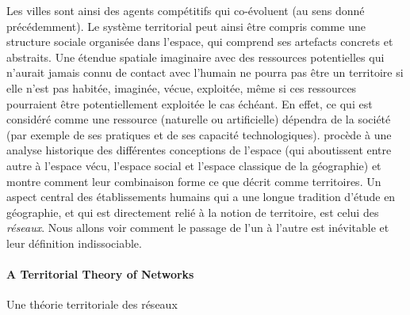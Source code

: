 {      Les villes sont ainsi des agents  compétitifs qui co-évoluent (au sens donné précédemment). Le système territorial peut ainsi être compris comme une structure sociale organisée dans l'espace, qui comprend ses artefacts concrets et abstraits. Une étendue spatiale imaginaire avec des ressources potentielles qui n'aurait jamais connu de contact avec l'humain ne pourra pas être un territoire si elle n'est pas habitée, imaginée, vécue, exploitée, même si ces ressources pourraient être potentiellement exploitée le cas échéant. En effet, ce qui est considéré comme une ressource (naturelle ou artificielle) dépendra de la société (par exemple de ses pratiques et de ses capacité technologiques). \cite{di1998espace} procède à une analyse historique des différentes conceptions de l'espace (qui aboutissent entre autre à l'espace vécu, l'espace social et l'espace classique de la géographie) et montre comment leur combinaison forme ce que  décrit comme territoires.
       Un aspect central des établissements humains qui a une longue tradition d'étude en géographie, et qui est directement relié à la notion de territoire, est celui des \emph{réseaux}. Nous allons voir comment le passage de l'un à l'autre est inévitable et leur définition indissociable.
}


\paragraph{A Territorial Theory of Networks}{Une théorie territoriale des réseaux}


